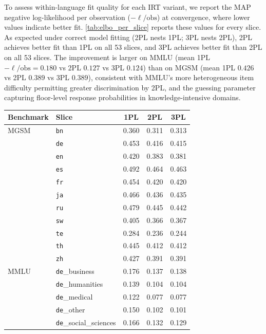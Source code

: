 \documentclass[11pt]{article}
\begin{document}
To assess within-language fit quality for each IRT variant, we report
the MAP negative log-likelihood per observation ($-\ell/\text{obs}$) at convergence,
where lower values indicate better fit.
\autoref{tab:elbo_per_slice} reports these values for every slice.
As expected under correct model fitting (2PL nests 1PL; 3PL nests 2PL),
2PL achieves better fit than 1PL on all 53 slices, and 3PL achieves better fit than 2PL on all 53 slices.
The improvement is larger on MMLU (mean 1PL $-\ell/\text{obs} = 0.180$ vs 2PL $0.127$ vs 3PL $0.124$)
than on MGSM (mean 1PL $0.426$ vs 2PL $0.389$ vs 3PL $0.389$),
consistent with MMLU's more heterogeneous item difficulty permitting greater discrimination by 2PL,
and the guessing parameter capturing floor-level response probabilities in knowledge-intensive domains.

\begin{table}[t]
  \centering
  \small
  \begin{tabular}{llccc}
    \toprule
    \textbf{Benchmark} & \textbf{Slice} & \textbf{1PL} & \textbf{2PL} & \textbf{3PL} \\
    \midrule
    MGSM & \texttt{bn} & 0.360 & 0.311 & 0.313 \\
         & \texttt{de} & 0.453 & 0.416 & 0.415 \\
         & \texttt{en} & 0.420 & 0.383 & 0.381 \\
         & \texttt{es} & 0.492 & 0.464 & 0.463 \\
         & \texttt{fr} & 0.454 & 0.420 & 0.420 \\
         & \texttt{ja} & 0.466 & 0.436 & 0.435 \\
         & \texttt{ru} & 0.479 & 0.445 & 0.442 \\
         & \texttt{sw} & 0.405 & 0.366 & 0.367 \\
         & \texttt{te} & 0.284 & 0.236 & 0.244 \\
         & \texttt{th} & 0.445 & 0.412 & 0.412 \\
         & \texttt{zh} & 0.427 & 0.391 & 0.391 \\
    \midrule
    MMLU  & \texttt{de}\_business        & 0.176 & 0.137 & 0.138 \\
          & \texttt{de}\_humanities      & 0.139 & 0.104 & 0.104 \\
          & \texttt{de}\_medical         & 0.122 & 0.077 & 0.077 \\
          & \texttt{de}\_other           & 0.150 & 0.102 & 0.101 \\
          & \texttt{de}\_social\_sciences & 0.166 & 0.132 & 0.129 \\

\end{tabular}
\end{table}
\end{document}
